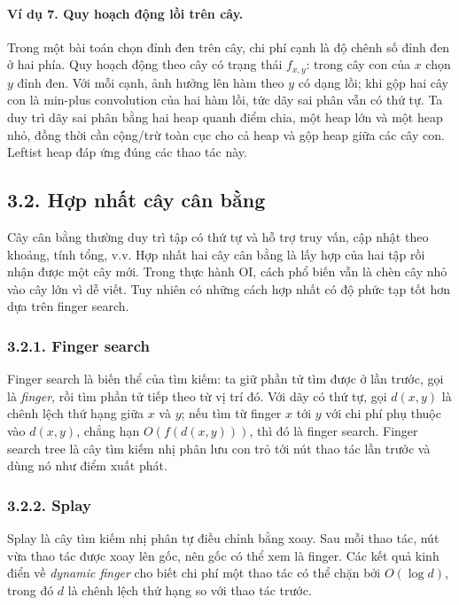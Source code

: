\documentclass[11pt]{article}
\begin{document}
\paragraph{Ví dụ 7. Quy hoạch động lồi trên cây.}
Trong một bài toán chọn đỉnh đen trên cây, chi phí cạnh là độ chênh số đỉnh đen
ở hai phía. Quy hoạch động theo cây có trạng thái \(f_{x,y}\): trong cây con
của \(x\) chọn \(y\) đỉnh đen. Với mỗi cạnh, ảnh hưởng lên hàm theo \(y\) có
dạng lồi; khi gộp hai cây con là min-plus convolution của hai hàm lồi, tức dãy
sai phân vẫn có thứ tự. Ta duy trì dãy sai phân bằng hai heap quanh điểm chia,
một heap lớn và một heap nhỏ, đồng thời cần cộng/trừ toàn cục cho cả heap và
gộp heap giữa các cây con. Leftist heap đáp ứng đúng các thao tác này.

\subsection*{3.2. Hợp nhất cây cân bằng}

Cây cân bằng thường duy trì tập có thứ tự và hỗ trợ truy vấn, cập nhật theo
khoảng, tính tổng, v.v. Hợp nhất hai cây cân bằng là lấy hợp của hai tập rồi
nhận được một cây mới. Trong thực hành OI, cách phổ biến vẫn là chèn cây nhỏ
vào cây lớn vì dễ viết. Tuy nhiên có những cách hợp nhất có độ phức tạp tốt hơn
dựa trên finger search.

\subsubsection*{3.2.1. Finger search}

Finger search là biến thể của tìm kiếm: ta giữ phần tử tìm được ở lần trước,
gọi là \emph{finger}, rồi tìm phần tử tiếp theo từ vị trí đó. Với dãy có thứ
tự, gọi \(d(x,y)\) là chênh lệch thứ hạng giữa \(x\) và \(y\); nếu tìm từ
finger \(x\) tới \(y\) với chi phí phụ thuộc vào \(d(x,y)\), chẳng hạn
\(O(f(d(x,y)))\), thì đó là finger search. Finger search tree là cây tìm kiếm
nhị phân lưu con trỏ tới nút thao tác lần trước và dùng nó như điểm xuất phát.

\subsubsection*{3.2.2. Splay}

Splay là cây tìm kiếm nhị phân tự điều chỉnh bằng xoay. Sau mỗi thao tác, nút
vừa thao tác được xoay lên gốc, nên gốc có thể xem là finger. Các kết quả kinh
điển về \emph{dynamic finger} cho biết chi phí một thao tác có thể chặn bởi
\(O(\log d)\), trong đó \(d\) là chênh lệch thứ hạng so với thao tác trước.
\end{document}
